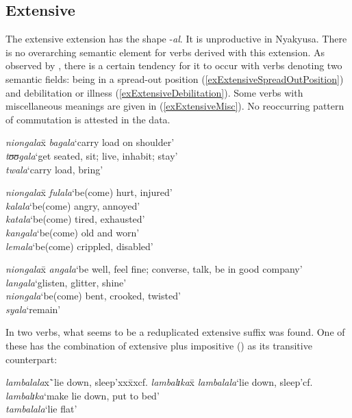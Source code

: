 \subsection{Extensive} \label{extensive}
The extensive extension has the shape -\textit{al}. It is unproductive in Nyakyusa. There is no overarching semantic element for verbs derived with this extension. As observed by \citet[77]{SchadebergT2003a}, there is a certain tendency for it to occur with verbs denoting two semantic fields: being in a spread-out position (\ref{exExtensiveSpreadOutPosition}) and debilitation or illness (\ref{exExtensiveDebilitation}). Some verbs with miscellaneous meanings are given in (\ref{exExtensiveMisc}). No reoccurring pattern of commutation is attested in the data.
\begin{exe}
\ex \label{exExtensiveSpreadOutPosition}
\begin{tabbing}
\textit{niongala}x\=\kill
\textit{bagala}\>`carry load on shoulder'\\
\textit{tʊʊgala}\>`get seated, sit; live, inhabit; stay'\\
\textit{twala}\>`carry load, bring'
\end{tabbing}
\ex\label{exExtensiveDebilitation}
\begin{tabbing}
\textit{niongala}x\=\kill
\textit{fulala}\>`be(come) hurt, injured'\\
\textit{kalala}\>`be(come) angry, annoyed'\\
\textit{katala}\>`be(come) tired, exhausted'\\
\textit{kangala}\>`be(come) old and worn'\\
\textit{lemala}\>`be(come) crippled, disabled'
\end{tabbing}
\ex\label{exExtensiveMisc}
\begin{tabbing}
\textit{niongala}x\=\kill
\textit{angala}\>`be well, feel fine; converse, talk, be in good company'\\
\textit{langala}\>`glisten, glitter, shine'\\
\textit{niongala}\>`be(come) bent, crooked, twisted'\\
\textit{syala}\>`remain'
\end{tabbing}
\end{exe}

In two verbs, what seems to be a reduplicated extensive suffix was found. One of these has the combination of extensive plus impositive () as its transitive counterpart:
\begin{exe}
\ex
\begin{tabbing}
\textit{lambalala}x\=`lie down, sleep'xx\=xxcf. \textit{lambalɪka}x\=\kill
\textit{lambalala}\>`lie down, sleep'\>cf. \textit{lambalɪka}\>`make lie down, put to bed'\\
\textit{tambalala}\>`lie flat'
\end{tabbing}
\end{exe}
